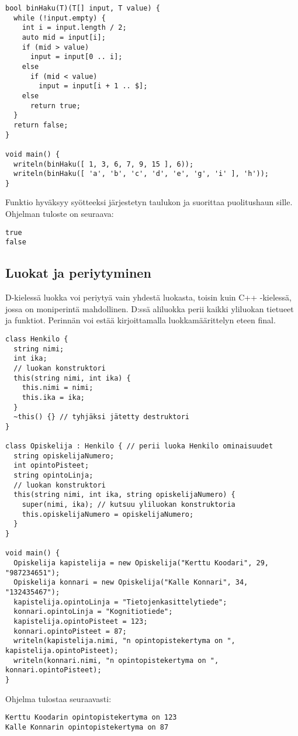 \documentclass[11pt,oneside,a4paper]{article}
\begin{document}
\begin{verbatim}
bool binHaku(T)(T[] input, T value) {
  while (!input.empty) {
    int i = input.length / 2;
    auto mid = input[i];
    if (mid > value)
      input = input[0 .. i];
    else 
      if (mid < value)
        input = input[i + 1 .. $];
    else 
      return true;
  }
  return false;
}

void main() {
  writeln(binHaku([ 1, 3, 6, 7, 9, 15 ], 6));
  writeln(binHaku([ 'a', 'b', 'c', 'd', 'e', 'g', 'i' ], 'h'));
}
\end{verbatim}

Funktio hyväksyy syötteeksi järjestetyn taulukon ja suorittaa puolitushaun sille. Ohjelman tuloste on seuraava:
\begin{verbatim}
true
false
\end{verbatim}

\subsection{Luokat ja periytyminen}
D-kielessä luokka voi periytyä vain yhdestä luokasta, toisin kuin C++ -kielessä, jossa on moniperintä mahdollinen. D:ssä aliluokka perii kaikki yliluokan tietueet ja funktiot. Perinnän voi estää kirjoittamalla luokkamäärittelyn eteen final. 
\begin{verbatim}
class Henkilo {
  string nimi;
  int ika;
  // luokan konstruktori
  this(string nimi, int ika) {
    this.nimi = nimi;
    this.ika = ika;
  }
  ~this() {} // tyhjäksi jätetty destruktori
}

class Opiskelija : Henkilo { // perii luoka Henkilo ominaisuudet
  string opiskelijaNumero;
  int opintoPisteet;
  string opintoLinja;
  // luokan konstruktori
  this(string nimi, int ika, string opiskelijaNumero) { 
    super(nimi, ika); // kutsuu yliluokan konstruktoria
    this.opiskelijaNumero = opiskelijaNumero;
  }
}

void main() {
  Opiskelija kapistelija = new Opiskelija("Kerttu Koodari", 29, "987234651");
  Opiskelija konnari = new Opiskelija("Kalle Konnari", 34, "132435467");
  kapistelija.opintoLinja = "Tietojenkasittelytiede";
  konnari.opintoLinja = "Kognitiotiede";
  kapistelija.opintoPisteet = 123;
  konnari.opintoPisteet = 87;
  writeln(kapistelija.nimi, "n opintopistekertyma on ", kapistelija.opintoPisteet);
  writeln(konnari.nimi, "n opintopistekertyma on ", konnari.opintoPisteet);
}
\end{verbatim}
Ohjelma tulostaa seuraavasti:

\begin{verbatim}
Kerttu Koodarin opintopistekertyma on 123
Kalle Konnarin opintopistekertyma on 87
\end{verbatim}
\end{document}

